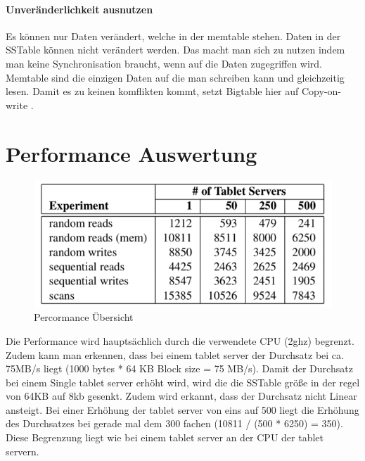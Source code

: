 \paragraph{Unveränderlichkeit ausnutzen}
Es können nur Daten verändert, welche in der memtable stehen. Daten in der SSTable können nicht verändert werden. Das macht man sich zu nutzen indem man keine Synchronisation braucht, wenn auf die Daten zugegriffen wird. Memtable sind die einzigen Daten auf die man schreiben kann und gleichzeitig lesen. Damit es zu keinen komflikten kommt, setzt Bigtable hier auf \glqq Copy-on-write \grqq. 

\section{Performance Auswertung}
\begin{figure}[!htpb]
	\centering
	\includegraphics[]{pics/bigtable_performance.png}
	\caption {Percormance Übersicht}	
\end{figure}
Die Performance wird hauptsächlich durch die verwendete CPU (2ghz) begrenzt. Zudem kann man erkennen, dass bei einem tablet server der Durchsatz bei ca. 75MB/s liegt (1000 bytes * 64 KB Block size = 75 MB/s). Damit der Durchsatz bei einem Single tablet server erhöht wird, wird die die SSTable größe in der regel von 64KB auf 8kb gesenkt. 
Zudem wird erkannt, dass der Durchsatz nicht Linear ansteigt. Bei einer Erhöhung der tablet server von eins auf 500 liegt die Erhöhung des Durchsatzes bei gerade mal dem 300 fachen (10811 / (500 * 6250) = 350). Diese Begrenzung liegt wie bei einem tablet server an der CPU der tablet servern.
